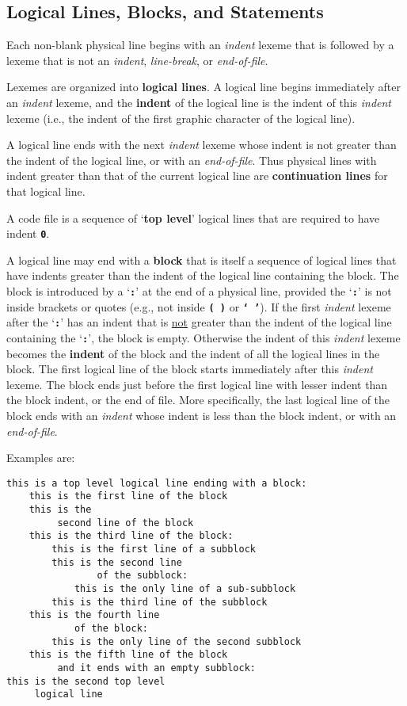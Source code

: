 \documentclass[12pt]{article}
\newcommand{\TT}[1]{{\tt \bfseries #1}}
\newcommand{\key}[1]{{\rm \bfseries #1}}
\newcommand{\skey}[2]{{\rm \bfseries #1#2}}
\newenvironment{indpar}[1][0.3in]%
	{\begin{list}{}%
		     {\setlength{\itemsep}{0in}%
		      \setlength{\topsep}{0in}%
		      \setlength{\parsep}{1ex}%
		      \setlength{\labelwidth}{#1}%
		      \setlength{\leftmargin}{#1}%
		      \addtolength{\leftmargin}{\labelsep}}%
	 \item}%
	{\end{list}}
\begin{document}
\subsection{Logical Lines, Blocks, and Statements}
\label{LOGICAL-LINES-BLOCKS-AND-STATEMENTS}

Each non-blank physical line begins with an {\em indent} lexeme
that is followed by a
lexeme that is not an {\em indent}, {\em line-break}, or
{\em end-of-file}.

Lexemes are organized into \skey{logical line}s.  A logical line
begins immediately after an {\em indent} lexeme, and the
\key{indent} of the logical line is the
indent of this {\em indent} lexeme (i.e., the indent of the
first graphic character of the logical line).

A logical line ends with the next {\em indent} lexeme whose indent
is not greater than the indent of the logical line, or with an
{\em end-of-file}.  Thus physical
lines with indent greater than that of the current logical line
are \skey{continuation line}s for that logical line.

A code file is a sequence of `\key{top level}' logical lines that
are required to have indent \TT{0}.

A logical line may end with a \key{block} that is itself a sequence of
logical lines that have indents greater than the indent of the
logical line containing the block.
The block is introduced by a `\TT{:}' at the end
of a physical line, provided the `\TT{:}' is not inside brackets
or quotes
(e.g., not inside \TT{(~)} or \TT{`~'}).
If the first {\em indent} lexeme after the
`\TT{:}' has an indent that is \underline{not} greater than the indent
of the logical line containing the `\TT{:}', the block is empty.
Otherwise the indent of this {\em indent} lexeme becomes the
\key{indent} of the block and the indent of all the
logical lines in the block.  The first logical line of the block
starts immediately after this {\em indent} lexeme.
The block ends just before the first
logical line with lesser indent than the block indent, or the end of file.
More specifically, the last logical line of the block ends with an
{\em indent} whose indent is less than the block indent, or with an
{\em end-of-file}.

Examples are:
\begin{indpar}\begin{verbatim}
this is a top level logical line ending with a block:
    this is the first line of the block
    this is the
         second line of the block
    this is the third line of the block:
        this is the first line of a subblock
        this is the second line
                of the subblock:
            this is the only line of a sub-subblock
        this is the third line of the subblock
    this is the fourth line
            of the block:
        this is the only line of the second subblock
    this is the fifth line of the block
         and it ends with an empty subblock:
this is the second top level
     logical line
\end{verbatim}\end{indpar}
\end{document}
